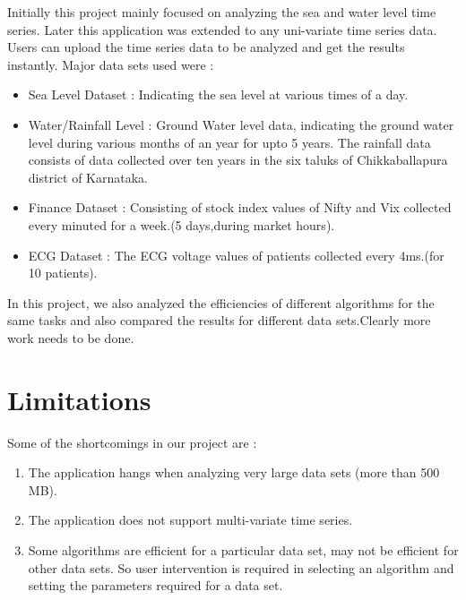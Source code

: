 \documentclass[12pt,a4paper]{report}
\begin{document}
Initially this project mainly focused on analyzing the sea and water level time series. Later this application was extended to any uni-variate time series data. Users can upload the time series data to be analyzed and get the results instantly. Major data sets used were :
\begin{itemize}
\item Sea Level Dataset : Indicating the sea level at various times of a day.
\item Water/Rainfall Level : Ground Water level data, indicating the ground water level during various months of an year for upto 5 years. The rainfall data consists of data collected over ten years in the six taluks of Chikkaballapura district of Karnataka.
\item Finance Dataset : Consisting of stock index values of  Nifty and Vix collected every minuted for a week.(5 days,during market hours).
\item ECG Dataset : The ECG  voltage values of patients collected every 4ms.(for 10 patients).
\end{itemize}


In this project, we also analyzed the efficiencies of different algorithms for the same tasks and also compared the results for different data sets.Clearly more work needs to be done.


\section{Limitations}
Some of the shortcomings in our project are :
\begin{enumerate}

\item{} The application hangs when analyzing very large data sets (more than 500 MB).
\item{} The application does not support multi-variate time series.
\item{}Some algorithms are efficient for a particular data set, may not be efficient for other data sets. So user intervention is required in selecting an algorithm and setting the parameters required for a data set.
\end{enumerate}
\end{document}
